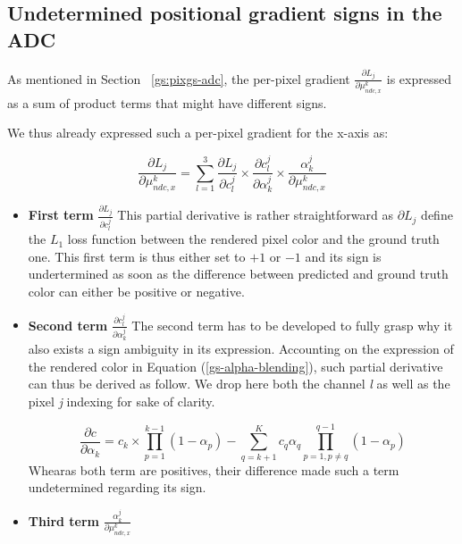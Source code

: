 \subsection{Undetermined positional gradient signs in the ADC}
\label{appendix:sign-gradient}

As mentioned in Section ~\ref{gs:pixgs-adc}, the per-pixel gradient $\frac{\partial L_{j}}{\partial \mu^{k}_{ndc,x}}$ is expressed as a sum of product terms that might have different signs. 

We thus already expressed such a per-pixel gradient for the x-axis as: 

\begin{equation}
    \label{eq:perpix-grad}
    \frac{\partial L_{j}}{\partial \mu^{k}_{ndc,x}} = \sum \limits_{l=1}^{3} \frac{\partial L_{j}}{\partial c_{l}^{j}}\times \frac{\partial c_{l}^{j}}{\partial \alpha_{k}^{j}} \times \frac{\alpha_{k}^{j}}{\partial \mu^{k}_{ndc,x} }
    \end{equation}

\begin{itemize}
    
    \item \textbf{First term} $\frac{\partial L_{j}}{\partial c_{l}^{j}}$ 
This partial derivative is rather straightforward as $\partial L_{j}$ define the $L_{1}$ loss function between the rendered pixel color and the ground truth one. This first term is thus either set to $+1$ or $-1$ and its sign is undertermined as soon as the difference between predicted and ground truth color can either be positive or negative. 

    \item \textbf{Second term} $\frac{\partial c_{l}^{j}}{\partial \alpha_{k}^{j}}$ 
The second term has to be developed to fully grasp why it also exists a sign ambiguity in its expression. Accounting on the expression of the rendered color in Equation (\ref{gs-alpha-blending}), such partial derivative can thus be derived as follow. We drop here both the channel  \textit{l} as well as the pixel \textit{j} indexing for sake of clarity.  

\begin{equation}
    \frac{\partial c}{\partial \alpha_{k}} = c_{k} \times \prod \limits_{p=1}^{k-1}(1 - \alpha_{p}) - \sum \limits_{q=k+1}^{K} c_{q}\alpha_{q}\prod \limits_{p=1,p\neq q}^{q-1}(1 - \alpha_{p})
\end{equation}
Whearas both term are positives, their difference made such a term undetermined regarding its sign. 

    \item \textbf{Third term} $\frac{\alpha_{k}^{j}}{\partial \mu^{k}_{ndc,x}}$ 
\end{itemize}






